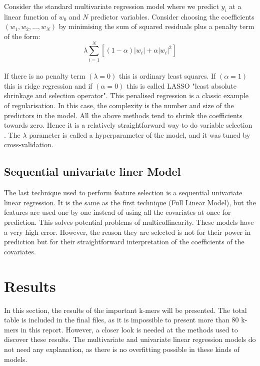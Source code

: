 \documentclass[11pt,twoside]{article}
\numberwithin{Theorem}{section}
\numberwithin{Definition}{section}
\numberwithin{Lemma}{section}
\numberwithin{Algorithm}{section}
\numberwithin{equation}{section}
\begin{document}
Consider the standard multivariate regression model where we predict $y_i$ at a linear function of $w_0$ and $N$ predictor variables. Consider choosing the coefficients $(w_1,w_2, ..., w_N)$ by minimising the sum of squared residuals plus a penalty term of the form:
\\
\begin{equation}
\lambda \sum_{i=1}^{N}[(1-\alpha)|w_i| + \alpha |w_i|^2]
\end{equation}
\\
If there is no penalty term $(\lambda = 0)$ this is ordinary least squares. If $(\alpha = 1)$ this is ridge regression and if $(\alpha = 0)$ this is called LASSO "least absolute shrinkage and selection operator". This penalised regression is a classic example of regularisation. In this case, the complexity is the number and size of the predictors in the model. All the above methods tend to shrink the coefficients towards zero. Hence it is a relatively straightforward way to do variable selection \cite{varian2014big}. The $\lambda$ parameter is called a hyperparameter of the model, and it was tuned by cross-validation. 

\subsection{Sequential univariate liner Model}
\label{sec:seq}

The last technique used to perform feature selection is a sequential univariate linear regression. It is the same as the first technique (Full Linear Model), but the features are used one by one instead of using all the covariates at once for prediction. This solves potential problems of multicollinearity. These models have a very high error. However, the reason they are selected is not for their power in prediction but for their straightforward interpretation of the coefficients of the covariates. 
\clearpage

\section{Results}
\label{sec:results}

In this section, the results of the important k-mers will be presented. The total table is included in the final files, as it is impossible to present more than $80$ k-mers in this report. However, a closer look is needed at the methods used to discover these results. The multivariate and univariate linear regression models do not need any explanation, as there is no overfitting possible in these kinds of models. 
\end{document}

